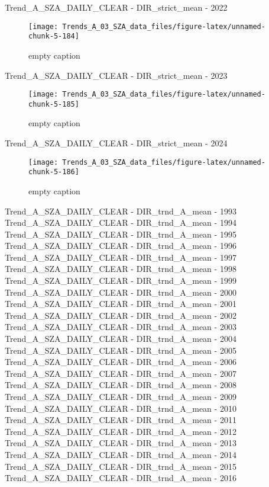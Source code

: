 \documentclass[
  10pt,
  a4paper,oneside]{article}
\begin{document}
Trend\_A\_SZA\_DAILY\_CLEAR - DIR\_strict\_mean - 2022

\begin{figure}[!ht]

{\centering \texttt{[image: Trends\_A\_03\_SZA\_data\_files/figure-latex/unnamed-chunk-5-184]} 

}

\caption{ empty caption }\label{fig:unnamed-chunk-5-184}
\end{figure}

Trend\_A\_SZA\_DAILY\_CLEAR - DIR\_strict\_mean - 2023

\begin{figure}[!ht]

{\centering \texttt{[image: Trends\_A\_03\_SZA\_data\_files/figure-latex/unnamed-chunk-5-185]} 

}

\caption{ empty caption }\label{fig:unnamed-chunk-5-185}
\end{figure}

Trend\_A\_SZA\_DAILY\_CLEAR - DIR\_strict\_mean - 2024

\begin{figure}[!ht]

{\centering \texttt{[image: Trends\_A\_03\_SZA\_data\_files/figure-latex/unnamed-chunk-5-186]} 

}

\caption{ empty caption }\label{fig:unnamed-chunk-5-186}
\end{figure}

Trend\_A\_SZA\_DAILY\_CLEAR - DIR\_trnd\_A\_mean - 1993
Trend\_A\_SZA\_DAILY\_CLEAR - DIR\_trnd\_A\_mean - 1994
Trend\_A\_SZA\_DAILY\_CLEAR - DIR\_trnd\_A\_mean - 1995
Trend\_A\_SZA\_DAILY\_CLEAR - DIR\_trnd\_A\_mean - 1996
Trend\_A\_SZA\_DAILY\_CLEAR - DIR\_trnd\_A\_mean - 1997
Trend\_A\_SZA\_DAILY\_CLEAR - DIR\_trnd\_A\_mean - 1998
Trend\_A\_SZA\_DAILY\_CLEAR - DIR\_trnd\_A\_mean - 1999
Trend\_A\_SZA\_DAILY\_CLEAR - DIR\_trnd\_A\_mean - 2000
Trend\_A\_SZA\_DAILY\_CLEAR - DIR\_trnd\_A\_mean - 2001
Trend\_A\_SZA\_DAILY\_CLEAR - DIR\_trnd\_A\_mean - 2002
Trend\_A\_SZA\_DAILY\_CLEAR - DIR\_trnd\_A\_mean - 2003
Trend\_A\_SZA\_DAILY\_CLEAR - DIR\_trnd\_A\_mean - 2004
Trend\_A\_SZA\_DAILY\_CLEAR - DIR\_trnd\_A\_mean - 2005
Trend\_A\_SZA\_DAILY\_CLEAR - DIR\_trnd\_A\_mean - 2006
Trend\_A\_SZA\_DAILY\_CLEAR - DIR\_trnd\_A\_mean - 2007
Trend\_A\_SZA\_DAILY\_CLEAR - DIR\_trnd\_A\_mean - 2008
Trend\_A\_SZA\_DAILY\_CLEAR - DIR\_trnd\_A\_mean - 2009
Trend\_A\_SZA\_DAILY\_CLEAR - DIR\_trnd\_A\_mean - 2010
Trend\_A\_SZA\_DAILY\_CLEAR - DIR\_trnd\_A\_mean - 2011
Trend\_A\_SZA\_DAILY\_CLEAR - DIR\_trnd\_A\_mean - 2012
Trend\_A\_SZA\_DAILY\_CLEAR - DIR\_trnd\_A\_mean - 2013
Trend\_A\_SZA\_DAILY\_CLEAR - DIR\_trnd\_A\_mean - 2014
Trend\_A\_SZA\_DAILY\_CLEAR - DIR\_trnd\_A\_mean - 2015
Trend\_A\_SZA\_DAILY\_CLEAR - DIR\_trnd\_A\_mean - 2016
\end{document}
